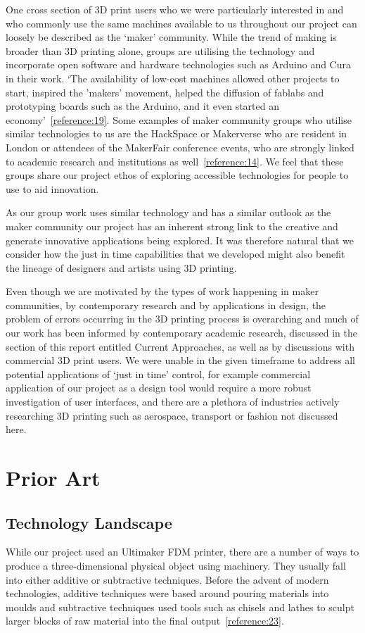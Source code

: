 \documentclass[11pt]{article} %
\begin{document}
One cross section of 3D print users who we were particularly interested in and who commonly use the same machines available to us throughout our project can loosely be described as the ‘maker’ community. While the trend of making is broader than 3D printing alone, groups are utilising the technology and incorporate open software and hardware technologies such as Arduino and Cura in their work. ‘The availability of low-cost machines allowed other projects to start, inspired the 'makers' movement, helped the diffusion of fablabs and prototyping boards such as the Arduino, and it even started an economy’~\ref{reference:19}. Some examples of maker community groups who utilise similar technologies to us are the HackSpace or Makerverse who are resident in London or attendees of the MakerFair conference events, who are strongly linked to academic research and institutions as well~\ref{reference:14}. We feel that these groups share our project ethos of exploring accessible technologies for people to use to aid innovation. 

As our group work uses similar technology and has a similar outlook as the maker community our project has an inherent strong link to the creative and generate innovative applications being explored. It was therefore natural that we consider how the just in time capabilities that we developed might also benefit the lineage of designers and artists using 3D printing.  

Even though we are motivated by the types of work happening in maker communities, by contemporary research and by applications in design, the problem of errors occurring in the 3D printing process is overarching and much of our work has been informed by contemporary academic research, discussed in the section of this report entitled Current Approaches, as well as by discussions with commercial 3D print users. We were unable in the given timeframe to address all potential applications of ‘just in time’ control, for example commercial application of our project as a design tool would require a more robust investigation of user interfaces, and there are a plethora of industries actively researching 3D printing such as aerospace, transport or fashion not discussed here.





\section{Prior Art}
\subsection{Technology Landscape}
\label{section:TechnologyLandscape}
While our project used an Ultimaker FDM printer, there are a number of ways to produce a three-dimensional physical object using machinery. They usually fall into either additive or subtractive techniques. Before the advent of modern technologies, additive techniques were based around pouring materials into moulds and subtractive techniques used tools such as chisels and lathes to sculpt larger blocks of raw material into the final output~\ref{reference:23}.
\end{document}
